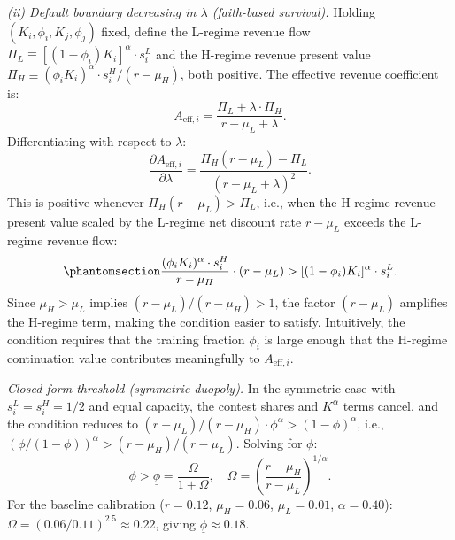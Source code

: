 \documentclass[
  11pt,
  letterpaper,
]{scrartcl}
\begin{document}
\emph{(ii) Default boundary decreasing in \(\lambda\) (faith-based
survival).} Holding \((K_i, \phi_i, K_j, \phi_j)\) fixed, define the
L-regime revenue flow
\(\Pi_L \equiv [(1-\phi_i)K_i]^\alpha \cdot s_i^L\) and the H-regime
revenue present value
\(\Pi_H \equiv (\phi_i K_i)^\alpha \cdot s_i^H / (r - \mu_H)\), both
positive. The effective revenue coefficient is: \[
A_{\text{eff},i} = \frac{\Pi_L + \lambda \cdot \Pi_H}{r - \mu_L + \lambda}.
\] Differentiating with respect to \(\lambda\): \[
\frac{\partial A_{\text{eff},i}}{\partial \lambda} = \frac{\Pi_H(r - \mu_L) - \Pi_L}{(r - \mu_L + \lambda)^2}.
\] This is positive whenever \(\Pi_H(r - \mu_L) > \Pi_L\), i.e., when
the H-regime revenue present value scaled by the L-regime net discount
rate \(r - \mu_L\) exceeds the L-regime revenue flow:
\begin{equation}\protect\phantomsection\label{eq-faith-condition}{
\frac{(\phi_i K_i)^\alpha \cdot s_i^H}{r - \mu_H} \cdot (r - \mu_L) > [(1-\phi_i)K_i]^\alpha \cdot s_i^L.
}\end{equation} Since \(\mu_H > \mu_L\) implies
\((r - \mu_L)/(r - \mu_H) > 1\), the factor \((r - \mu_L)\) amplifies
the H-regime term, making the condition easier to satisfy. Intuitively,
the condition requires that the training fraction \(\phi_i\) is large
enough that the H-regime continuation value contributes meaningfully to
\(A_{\text{eff},i}\).

\emph{Closed-form threshold (symmetric duopoly).} In the symmetric case
with \(s_i^L = s_i^H = 1/2\) and equal capacity, the contest shares and
\(K^\alpha\) terms cancel, and the condition reduces to
\((r - \mu_L)/(r - \mu_H) \cdot \phi^\alpha > (1-\phi)^\alpha\), i.e.,
\((\phi/(1-\phi))^\alpha > (r-\mu_H)/(r-\mu_L)\). Solving for \(\phi\):
\[
\phi > \underline{\phi} = \frac{\Omega}{1 + \Omega}, \quad \Omega = \left(\frac{r - \mu_H}{r - \mu_L}\right)^{1/\alpha}.
\] For the baseline calibration (\(r = 0.12\), \(\mu_H = 0.06\),
\(\mu_L = 0.01\), \(\alpha = 0.40\)):
\(\Omega = (0.06/0.11)^{2.5} \approx 0.22\), giving
\(\underline{\phi} \approx 0.18\).
\end{document}
